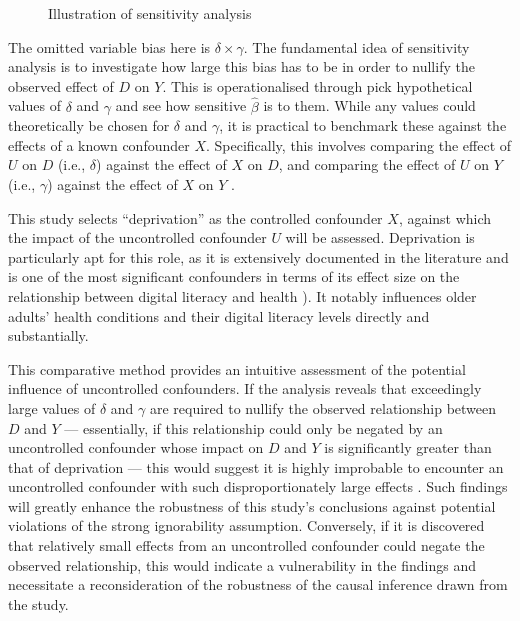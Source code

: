\begin{figure}[h!]
    \centering
    \caption{Illustration of sensitivity analysis}
    \label{fig:sense_dag}
\end{figure}

The omitted variable bias here is $\delta \times \gamma$. The fundamental idea of sensitivity analysis is to investigate how large this bias has to be in order to nullify the observed effect of $D$ on $Y$. This is operationalised through pick hypothetical values of $\delta$ and $\gamma$ and see how sensitive $\hat{\beta}$ is to them. While any values could theoretically be chosen for $\delta$ and $\gamma$, it is practical to benchmark these against the effects of a known confounder $X$. Specifically, this involves comparing the effect of $U$ on $D$ (i.e., $\delta$) against the effect of $X$ on $D$, and comparing the effect of $U$ on $Y$ (i.e., $\gamma$) against the effect of $X$ on $Y$ \parencite{vanderweele_sensitivity_2017}. 

This study selects ``deprivation” as the controlled confounder $X$, against which the impact of the uncontrolled confounder $U$ will be assessed. Deprivation is particularly apt for this role, as it is extensively documented in the literature and is one of the most significant confounders in terms of its effect size on the relationship between digital literacy and health \parencite{hall_digital_2015,he_factors_2022}). It notably influences older adults' health conditions and their digital literacy levels directly and substantially. 

This comparative method provides an intuitive assessment of the potential influence of uncontrolled confounders. If the analysis reveals that exceedingly large values of $\delta$ and $\gamma$ are required to nullify the observed relationship between $D$ and $Y$ — essentially, if this relationship could only be negated by an uncontrolled confounder whose impact on $D$ and $Y$ is significantly greater than that of deprivation — this would suggest it is highly improbable to encounter an uncontrolled confounder with such disproportionately large effects \parencite{shen_sensitivity_2011}. Such findings will greatly enhance the robustness of this study's conclusions against potential violations of the strong ignorability assumption. Conversely, if it is discovered that relatively small effects from an uncontrolled confounder could negate the observed relationship, this would indicate a vulnerability in the findings and necessitate a reconsideration of the robustness of the causal inference drawn from the study.

